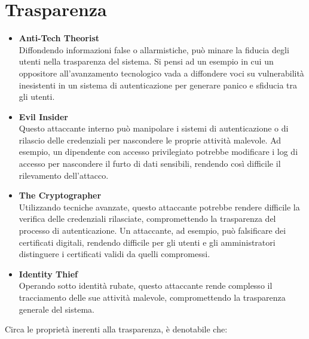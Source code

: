     \section{Trasparenza}
        \begin{itemize}
            \item \textbf{Anti-Tech Theorist} \\
                Diffondendo informazioni false o allarmistiche, può minare la fiducia degli utenti nella trasparenza del sistema.
                Si pensi ad un esempio in cui un oppositore all'avanzamento tecnologico vada a diffondere voci su vulnerabilità inesistenti in un sistema di autenticazione per generare panico e sfiducia tra gli utenti.

            \item \textbf{Evil Insider} \\
                Questo attaccante interno può manipolare i sistemi di autenticazione o di rilascio delle credenziali per nascondere le proprie attività malevole.
                Ad esempio, un dipendente con accesso privilegiato potrebbe modificare i log di accesso per nascondere il furto di dati sensibili, rendendo così difficile il rilevamento dell'attacco.

            \item \textbf{The Cryptographer} \\
                Utilizzando tecniche avanzate, questo attaccante potrebbe rendere difficile la verifica delle credenziali rilasciate, compromettendo la trasparenza del processo di autenticazione.
                Un attaccante, ad esempio, può falsificare dei certificati digitali, rendendo difficile per gli utenti e gli amministratori distinguere i certificati validi da quelli compromessi.

            \item \textbf{Identity Thief} \\
                Operando sotto identità rubate, questo attaccante rende complesso il tracciamento delle sue attività malevole, compromettendo la trasparenza generale del sistema.
        \end{itemize}

        \noindent Circa le proprietà inerenti alla trasparenza, è denotabile che:
        
